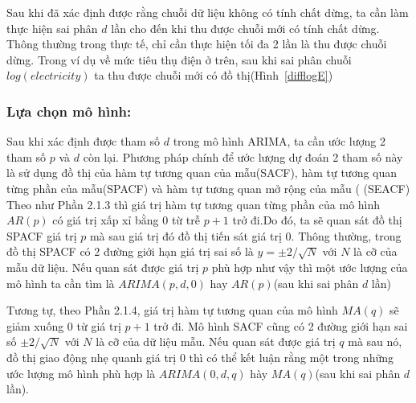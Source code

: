 Sau khi đã xác định được rằng chuỗi dữ liệu không có tính chất dừng, ta cần làm thực hiện sai phân $d$ lần cho đến khi thu được chuỗi mới có tính chất dừng. Thông thường trong thực tế, chỉ cần thực hiện tối đa 2 lần là thu được chuỗi dừng. Trong ví dụ về mức tiêu thụ điện ở trên, sau khi sai phân chuỗi $log(electricity)$ ta thu được chuỗi mới có đồ thị(Hình~\ref{difflogE}) 

\subsubsection{Lựa chọn mô hình:}
Sau khi xác định được tham số $d$ trong mô hình ARIMA, ta cần ước lượng 2 tham số $p$ và $d$ còn lại. Phương pháp chính để ước lượng dự đoán 2 tham số này là sử dụng đồ thị của hàm tự tương quan của mẫu(SACF), hàm tự tương quan từng phần của mẫu(SPACF) và hàm tự tương quan mở rộng của mẫu (
(SEACF)
Theo như Phần 2.1.3 thì giá trị hàm tự tương quan từng phần của mô hình $AR(p)$ có giá trị xấp xỉ bằng $0$ từ trễ $p+1$ trở đi.Do đó, ta sẽ quan sát đồ thị SPACF giá trị $p$ mà sau giá trị đó đồ thị tiến sát giá trị $0$. Thông thường, trong đồ thị SPACF có 2 đường giới hạn giá trị sai số là $y = \pm2/\sqrt{N}$ với $N$ là cỡ của mẫu dữ liệu. Nếu quan sát được giá trị $p$ phù hợp như vậy thì một ước lượng của mô hình ta cần tìm là $ARIMA(p,d,0)$ hay $AR(p)$(sau khi sai phân $d$ lần)

Tương tự, theo Phần 2.1.4, giá trị hàm tự tương quan của mô hình $MA(q)$ sẽ giảm xuống $0$ từ giá trị $p+1$ trở đi. Mô hình SACF cũng có 2 đường giới hạn sai số $\pm2/\sqrt{N}$ với $N$ là cỡ của dữ liệu mẫu. Nếu quan sát được giá trị $q$ mà sau nó, đồ thị giao động nhẹ quanh giá trị 0 thì có thể kết luận rằng một trong những ước lượng mô hình phù hợp là $ARIMA(0,d,q)$ hày $MA(q)$(sau khi sai phân $d$ lần).

